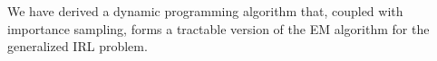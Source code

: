 % 
% 
% 

We have derived a dynamic programming algorithm that, coupled with
importance sampling, forms a tractable version of the EM algorithm for
the generalized IRL problem.


